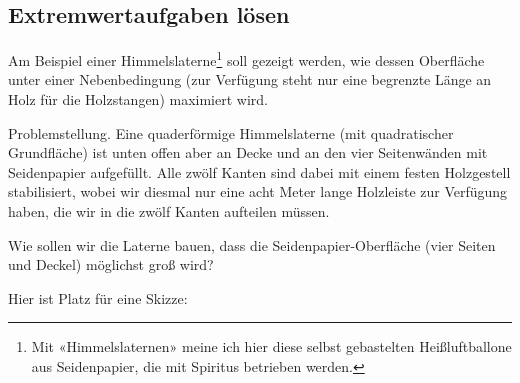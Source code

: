 \subsection{Extremwertaufgaben lösen}
Am Beispiel einer Himmelslaterne\footnote{Mit «Himmelslaternen» meine ich hier diese selbst gebastelten Heißluftballone aus Seidenpapier, die mit Spiritus betrieben werden.} soll gezeigt werden, wie dessen Oberfläche unter einer Nebenbedingung (zur Verfügung steht nur eine begrenzte Länge an Holz für die Holzstangen) maximiert wird.

Problemstellung. Eine quaderförmige Himmelslaterne (mit quadratischer
Grundfläche) ist unten offen aber an Decke und an den vier Seitenwänden mit Seidenpapier aufgefüllt. Alle zwölf Kanten sind dabei mit einem festen Holzgestell stabilisiert, wobei wir diesmal nur eine acht Meter lange Holzleiste zur Verfügung haben, die wir in die zwölf Kanten aufteilen müssen.

Wie sollen wir die Laterne bauen, dass die Seidenpapier-Oberfläche (vier Seiten und Deckel) möglichst groß wird?

Hier ist Platz für eine Skizze:


\newpage

